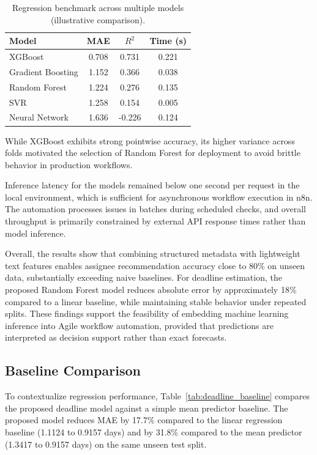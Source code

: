\documentclass[conference]{IEEEtran}
\begin{document}
\begin{table}[t]
\centering
\caption{Regression benchmark across multiple models (illustrative comparison).}
\renewcommand{\arraystretch}{1.05}
\begin{tabular}{l c c c}
\hline
\textbf{Model} & \textbf{MAE} & \textbf{$R^2$} & \textbf{Time (s)} \\
\hline
XGBoost & 0.708 & 0.731 & 0.221 \\
Gradient Boosting & 1.152 & 0.366 & 0.038 \\
Random Forest & 1.224 & 0.276 & 0.135 \\
SVR & 1.258 & 0.154 & 0.005 \\
Neural Network & 1.636 & -0.226 & 0.124 \\
\hline
\end{tabular}
\end{table}

While XGBoost exhibits strong pointwise accuracy, its higher variance across folds motivated the selection of Random Forest for deployment to avoid brittle behavior in production workflows.

Inference latency for the models remained below one second per request in the local environment, which is sufficient for asynchronous workflow execution in n8n. The automation processes issues in batches during scheduled checks, and overall throughput is primarily constrained by external API response times rather than model inference. 

Overall, the results show that combining structured metadata with lightweight text features enables assignee recommendation accuracy close to 80\% on unseen data, substantially exceeding naive baselines. For deadline estimation, the proposed Random Forest model reduces absolute error by approximately 18\% compared to a linear baseline, while maintaining stable behavior under repeated splits. These findings support the feasibility of embedding machine learning inference into Agile workflow automation, provided that predictions are interpreted as decision support rather than exact forecasts.


\subsection{Baseline Comparison}

To contextualize regression performance, Table~\ref{tab:deadline_baseline} compares the proposed deadline model against a simple mean predictor baseline. The proposed model reduces MAE by 17.7\% compared to the linear regression baseline (1.1124 to 0.9157 days) and by 31.8\% compared to the mean predictor (1.3417 to 0.9157 days) on the same unseen test split.
\end{document}
